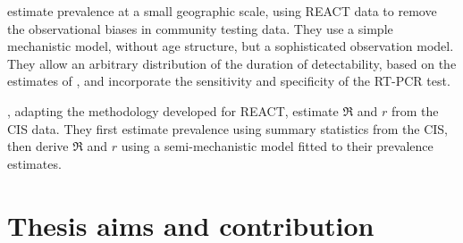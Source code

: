 \documentclass[thesis.tex]{subfiles}
\begin{document}
\Textcite{nicholsonImproving} estimate prevalence at a small geographic scale, using REACT data to remove the observational biases in community testing data.
They use a simple mechanistic model, without age structure, but a sophisticated observation model.
They allow an arbitrary distribution of the duration of detectability, based on the estimates of \textcite{hellewellPCRSensitivity}, and incorporate the sensitivity and specificity of the RT-PCR test.

\Textcite{mccabeCISincidence}, adapting the methodology \textcite{ealesAppropriately} developed for REACT, estimate $\Re$ and $r$ from the CIS data.
They first estimate prevalence using summary statistics from the CIS, then derive $\Re$ and $r$ using a semi-mechanistic model fitted to their prevalence estimates.




\section{Thesis aims and contribution} \label{intro:sec:aims}
\end{document}
